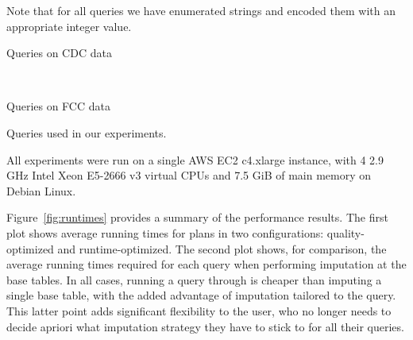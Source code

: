Note that for all queries we have enumerated strings and encoded them with
an appropriate integer value.

\begin{table}
\centering
 \begin{subtable}{\linewidth}
  
  \caption{Queries on CDC data}
  \label{fig:queries-cdc}
 \end{subtable}
 ~
 \begin{subtable}{\linewidth}
 
 \caption{Queries on FCC data}
 \label{fig:queries-fcc}
 \end{subtable}
  \caption{Queries used in our experiments.}
  \label{fig:queries}
\end{table}

%  

All experiments were run on a single AWS EC2 c4.xlarge instance, with 4 2.9 GHz Intel Xeon E5-2666 v3 virtual CPUs and 7.5 GiB of main memory on Debian Linux.

Figure~\ref{fig:runtimes} provides a summary of the performance results. The first plot shows average running times for \ProjectName{}
plans in two configurations: quality-optimized and runtime-optimized. The second plot shows, for comparison, the 
average running times required for each query when performing imputation at the base tables.
In all cases, running a query through \ProjectName{} is cheaper than 
imputing a single base table, with the added advantage of imputation tailored to the query. This latter point adds
significant flexibility to the user, who no longer needs to decide apriori what imputation strategy they have to stick to
for all their queries.


